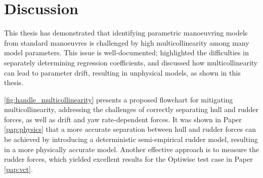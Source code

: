 \chapter{Discussion\label{ch:discussion}}
This thesis has demonstrated that identifying parametric manoeuvring models from standard manoeuvres is challenged by high multicollinearity among many model parameters. This issue is well-documented; \textcite{yoonIdentificationHydrodynamicCoefficients2003} highlighted the difficulties in separately determining regression coefficients, and \textcite{wangQuantifyingMulticollinearityShip2018} discussed how multicollinearity can lead to parameter drift, resulting in unphysical models, as shown in this thesis.

\autoref{fig:handle_multicollinearity} presents a proposed flowchart for mitigating multicollinearity, addressing the challenges of correctly separating hull and rudder forces, as well as drift and yaw rate-dependent forces.
It was shown in Paper \ref{pap:physics} that a more accurate separation between hull and rudder forces can be achieved by introducing a deterministic semi-empirical rudder model, resulting in a more physically accurate model. Another effective approach is to measure the rudder forces, which yielded excellent results for the Optiwise test case in Paper \ref{pap:vct}.
